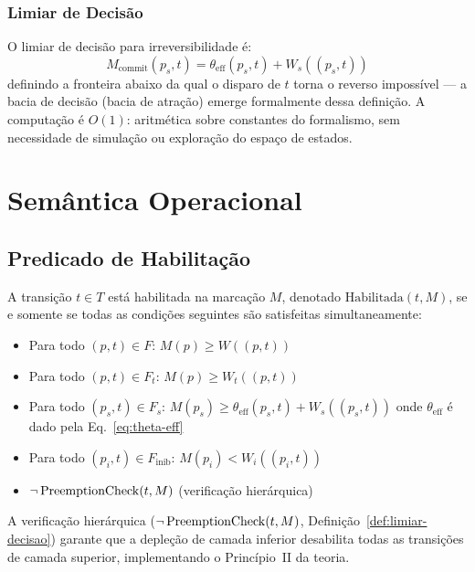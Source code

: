 \subsubsection{Limiar de Decisão}

O limiar de decisão para irreversibilidade é:
\begin{equation}
    M_{\text{commit}}(p_s, t) =
      \theta_{\mathrm{eff}}(p_s, t) + W_s((p_s,t))
  \label{eq:m-commit}
\end{equation}
definindo a fronteira abaixo da qual o disparo de $t$ torna o reverso
impossível --- a bacia de decisão (bacia de atração) emerge formalmente
dessa definição.  A computação é $O(1)$: aritmética sobre constantes do
formalismo, sem necessidade de simulação ou exploração do espaço de estados.

\section{Semântica Operacional}
\label{sec:semantica-operacional}

\subsection{Predicado de Habilitação}
\label{subsec:habilitacao}

\begin{definition}
\label{def:habilitacao}
A transição $t \in T$ está habilitada na marcação $M$,
denotado $\text{Habilitada}(t, M)$, se e somente se
todas as condições seguintes são satisfeitas simultaneamente:
\begin{itemize}
  \item Para todo $(p,t) \in F$: $M(p) \geq W((p,t))$
  \item Para todo $(p,t) \in F_t$: $M(p) \geq W_t((p,t))$
  \item Para todo $(p_s,t) \in F_s$:
        $M(p_s) \geq \theta_{\mathrm{eff}}(p_s,t) + W_s((p_s,t))$
        \quad onde $\theta_{\mathrm{eff}}$ é dado pela Eq.~\eqref{eq:theta-eff}
  \item Para todo $(p_i,t) \in F_{\text{inib}}$: $M(p_i) < W_i((p_i,t))$
  \item $\neg\operatorname{PreemptionCheck}(t, M)$ \quad (verificação hierárquica)
\end{itemize}
\end{definition}

A verificação hierárquica ($\neg\operatorname{PreemptionCheck}(t, M)$, Definição~\ref{def:limiar-decisao})
garante que a depleção de camada inferior desabilita todas as transições de camada
superior, implementando o Princípio~II da teoria.

